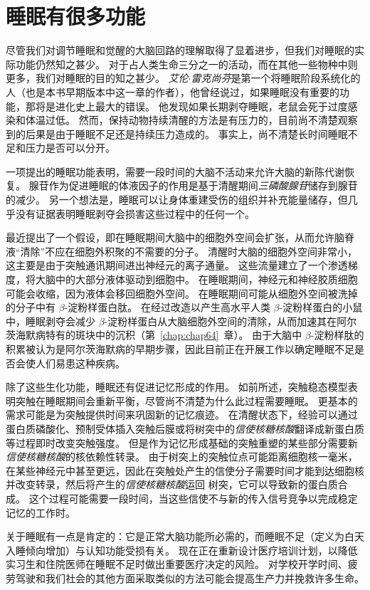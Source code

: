 \section{睡眠有很多功能}

尽管我们对调节睡眠和觉醒的大脑回路的理解取得了显着进步，但我们对睡眠的实际功能仍然知之甚少。
对于占人类生命三分之一的活动，而在其他一些物种中则更多，我们对睡眠的目的知之甚少。
\textit{艾伦$\cdot$雷克尚芬}是第一个将睡眠阶段系统化的人（也是本书早期版本中这一章的作者），他曾经说过，如果睡眠没有重要的功能，那将是进化史上最大的错误。
他发现如果长期剥夺睡眠，老鼠会死于过度感染和体温过低。
然而，保持动物持续清醒的方法是有压力的，目前尚不清楚观察到的后果是由于睡眠不足还是持续压力造成的。
事实上，尚不清楚长时间睡眠不足和压力是否可以分开。


一项提出的睡眠功能表明，需要一段时间的大脑不活动来允许大脑的新陈代谢恢复。
腺苷作为促进睡眠的体液因子的作用是基于清醒期间\textit{三磷酸腺苷}储存到腺苷的减少。
另一个想法是，睡眠可以让身体重建受伤的组织并补充能量储存，但几乎没有证据表明睡眠剥夺会损害这些过程中的任何一个。


最近提出了一个假设，即在睡眠期间大脑中的细胞外空间会扩张，从而允许脑脊液“清除”不应在细胞外积聚的不需要的分子。
清醒时大脑的细胞外空间非常小，这主要是由于突触通讯期间进出神经元的离子通量。
这些流量建立了一个渗透梯度，将大脑中的大部分液体驱动到细胞中。
在睡眠期间，神经元和神经胶质细胞可能会收缩，因为液体会移回细胞外空间。
在睡眠期间可能从细胞外空间被洗掉的分子中有 $ \beta $-淀粉样蛋白肽。
在经过改造以产生高水平人类 $ \beta $-淀粉样蛋白的小鼠中，睡眠剥夺会减少 $ \beta $-淀粉样蛋白从大脑细胞外空间的清除，从而加速其在阿尔茨海默病特有的斑块中的沉积（第~\ref{chap:chap64}~章）。
由于大脑中 $ \beta $-淀粉样肽的积累被认为是阿尔茨海默病的早期步骤，因此目前正在开展工作以确定睡眠不足是否会使人们易患这种疾病。


除了这些生化功能，睡眠还有促进记忆形成的作用。
如前所述，突触稳态模型表明突触在睡眠期间会重新平衡，尽管尚不清楚为什么此过程需要睡眠。
更基本的需求可能是为突触提供时间来巩固新的记忆痕迹。
在清醒状态下，经验可以通过蛋白质磷酸化、预制受体插入突触后膜或将树突中的\textit{信使核糖核酸}翻译成新蛋白质等过程即时改变突触强度。
但是作为记忆形成基础的突触重塑的某些部分需要新\textit{信使核糖核酸}的核依赖性转录。
由于树突上的突触位点可能距离细胞核一毫米，在某些神经元中甚至更远，因此在突触处产生的信使分子需要时间才能到达细胞核并改变转录，然后将产生的\textit{信使核糖核酸}运回 树突，它可以导致新的蛋白质合成。
这个过程可能需要一段时间，当这些信使不与新的传入信号竞争以完成稳定记忆的工作时。


关于睡眠有一点是肯定的：它是正常大脑功能所必需的，而睡眠不足（定义为白天入睡倾向增加）与认知功能受损有关。
现在正在重新设计医疗培训计划，以降低实习生和住院医师在睡眠不足时做出重要医疗决定的风险。
对学校开学时间、疲劳驾驶和我们社会的其他方面采取类似的方法可能会提高生产力并挽救许多生命。



